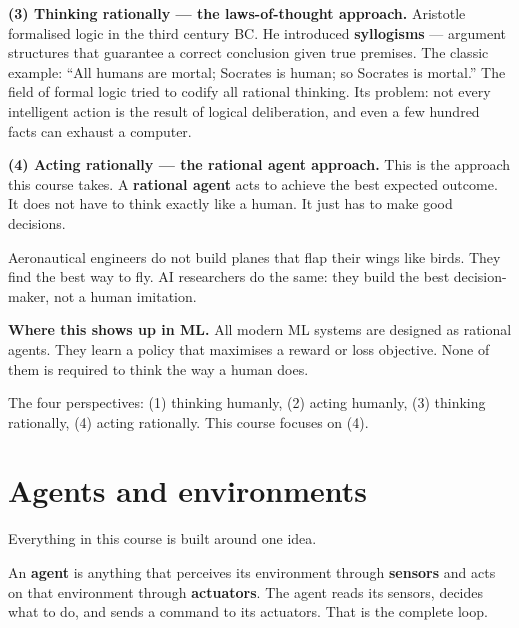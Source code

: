 \documentclass[a4paper,11pt]{article}
\newcommand{\vocab}[1]{\textbf{\color{navy}#1}}
\begin{document}
\textbf{(3) Thinking rationally --- the laws-of-thought approach.}
Aristotle formalised logic in the third century BC.
He introduced \vocab{syllogisms} --- argument structures that guarantee a
correct conclusion given true premises.
The classic example: ``All humans are mortal; Socrates is human; so
Socrates is mortal.''
The field of formal logic tried to codify all rational thinking.
Its problem: not every intelligent action is the result of logical
deliberation, and even a few hundred facts can exhaust a computer.

\textbf{(4) Acting rationally --- the rational agent approach.}
This is the approach this course takes.
A \vocab{rational agent} acts to achieve the best expected outcome.
It does not have to think exactly like a human.
It just has to make good decisions.

\begin{everyday}
Aeronautical engineers do not build planes that flap their wings like
birds. They find the best way to fly. AI researchers do the same: they
build the best decision-maker, not a human imitation.
\end{everyday}

\textbf{Where this shows up in ML.}
All modern ML systems are designed as rational agents.
They learn a policy that maximises a reward or loss objective.
None of them is required to think the way a human does.

\begin{keytake}
The four perspectives: (1) thinking humanly, (2) acting humanly, (3) thinking
rationally, (4) acting rationally. This course focuses on (4).
\end{keytake}

\section{Agents and environments}

Everything in this course is built around one idea.

\begin{intuition}
An \vocab{agent} is anything that perceives its environment through
\vocab{sensors} and acts on that environment through \vocab{actuators}.
The agent reads its sensors, decides what to do, and sends a command to
its actuators. That is the complete loop.
\end{intuition}
\end{document}
